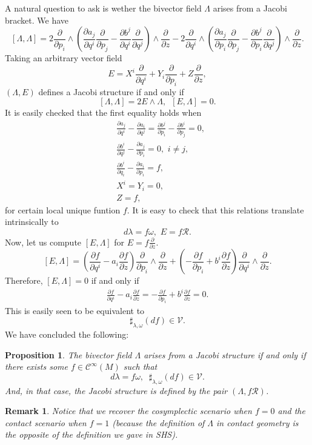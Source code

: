 \documentclass[12pt]{article}
\newtheorem{prop}{Proposition}[section]
\newtheorem{remark}{Remark}[section]
\newcommand{\partder}[2]{\frac{\partial #1}{\partial #2}}
\begin{document}
A natural question to ask is wether the bivector field $\Lambda$ arises from a Jacobi bracket. We have 
$$[\Lambda, \Lambda] = 2 \partder{}{p_i} \wedge \left ( \partder{a_j}{q^i} \partder{}{p_j} - \partder{b^j}{q^i} \partder{}{q^j}  \right) \wedge \partder{}{z} - 2 \partder{}{q^i} \wedge \left( \partder{a_j}{p_i} \partder{}{p_j} - \partder{b^j}{p_i}\partder{}{q^j} \right) \wedge \partder{}{z}.$$ Taking an arbitrary vector field $$E = X^i \partder{}{q^i} + Y_i \partder{}{p_i} + Z \partder{}{z},$$ $(\Lambda, E)$ defines a Jacobi structure if and only if $$[\Lambda, \Lambda] = 2 E \wedge \Lambda, \,\,\,[E, \Lambda] = 0.$$ It is easily checked that the first equality holds when
\begin{align}
&\partder{a_j}{q^i} - \partder{a_ i}{q^j} = \partder{b^j}{p_i} - \partder{b^i}{p_j} = 0,\\
&  \partder{b^i}{q^j} -\partder{a_j}{p_i} = 0, \,\, i \neq j,\\
&  \partder{b^i}{q_i} - \partder{a_i}{p_i}= f,\\
&X^i = Y_i = 0,\\
&Z = f,
\end{align}
for certain local unique funtion $f$. It is easy to check that this relations translate intrinsically to $$d\lambda = f \omega, \,\, E =  f \mathcal{R}.$$
Now, let us compute $[E, \Lambda]$ for $E = f \displaystyle{\partder{}{z}}.$
$$[E, \Lambda] = \left ( \partder{f}{q^i} - a_i \partder{f}{z}\right) \partder{}{p_i} \wedge \partder{}{z} + \left (- \partder{f}{p_i} + b^i \partder{f}{z} \right ) \partder{}{q^i} \wedge \partder{}{z}.$$
Therefore, $[E, \Lambda] = 0$ if and only if 
\begin{align}
    \partder{f}{q^i} - a_i \partder{f}{z} = -\partder{f}{p_i} + b^i \partder{f}{z} = 0.
\end{align}
This is easily seen to be equivalent to $$\sharp_{\lambda, \omega}(df) \in \mathcal{V}.$$
We have concluded the following:\\
\begin{prop} The bivector field $\Lambda$ arises from a Jacobi structure if and only if there exists some $f \in \mathcal{C}^\infty(M)$ such that $$d\lambda = f \omega, \,\,\ \sharp_{\lambda, \omega}(df) \in \mathcal{V}.$$ And, in that case, the Jacobi structure is defined by the pair $(\Lambda, f \mathcal{R})$.\\
\end{prop}
\begin{remark} {\rm Notice that we recover the cosymplectic scenario when $f = 0$ and the contact scenario when $f = 1$ (because the definition of $\Lambda$ in contact geometry is the opposite of the definition we gave in SHS).}
\end{remark}
\end{document}
